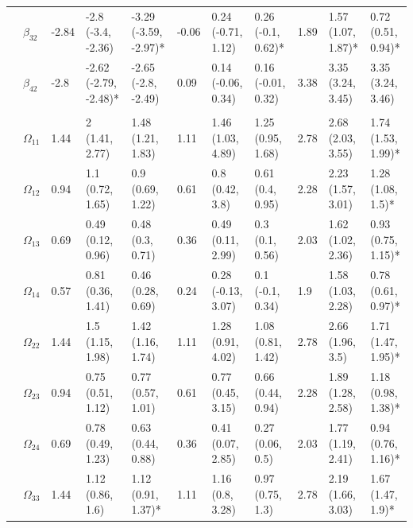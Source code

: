 \documentclass{article}
\begin{document}
\begin{landscape}
\begin{table}[t]
\begin{tabular}{lllllllllll}
\hspace{1em} & $\beta_{32}$ & -2.84 & -2.8 (-3.4, -2.36) & -3.29 (-3.59, -2.97)* & -0.06 & 0.24 (-0.71, 1.12) & 0.26 (-0.1, 0.62)* & 1.89 & 1.57 (1.07, 1.87)* & 0.72 (0.51, 0.94)*\\
\hspace{1em} & $\beta_{42}$ & -2.8 & -2.62 (-2.79, -2.48)* & -2.65 (-2.8, -2.49) & 0.09 & 0.14 (-0.06, 0.34) & 0.16 (-0.01, 0.32) & 3.38 & 3.35 (3.24, 3.45) & 3.35 (3.24, 3.46)\\
\addlinespace[0.3em]
\multicolumn{11}{l}{\textbf{ }}\\
\hspace{1em} & $\Omega_{11}$ & 1.44 & 2 (1.41, 2.77) & 1.48 (1.21, 1.83) & 1.11 & 1.46 (1.03, 4.89) & 1.25 (0.95, 1.68) & 2.78 & 2.68 (2.03, 3.55) & 1.74 (1.53, 1.99)*\\
\hspace{1em} & $\Omega_{12}$ & 0.94 & 1.1 (0.72, 1.65) & 0.9 (0.69, 1.22) & 0.61 & 0.8 (0.42, 3.8) & 0.61 (0.4, 0.95) & 2.28 & 2.23 (1.57, 3.01) & 1.28 (1.08, 1.5)*\\
\hspace{1em} & $\Omega_{13}$ & 0.69 & 0.49 (0.12, 0.96) & 0.48 (0.3, 0.71) & 0.36 & 0.49 (0.11, 2.99) & 0.3 (0.1, 0.56) & 2.03 & 1.62 (1.02, 2.36) & 0.93 (0.75, 1.15)*\\
\hspace{1em} & $\Omega_{14}$ & 0.57 & 0.81 (0.36, 1.41) & 0.46 (0.28, 0.69) & 0.24 & 0.28 (-0.13, 3.07) & 0.1 (-0.1, 0.34) & 1.9 & 1.58 (1.03, 2.28) & 0.78 (0.61, 0.97)*\\
\hspace{1em} & $\Omega_{22}$ & 1.44 & 1.5 (1.15, 1.98) & 1.42 (1.16, 1.74) & 1.11 & 1.28 (0.91, 4.02) & 1.08 (0.81, 1.42) & 2.78 & 2.66 (1.96, 3.5) & 1.71 (1.47, 1.95)*\\
\hspace{1em} & $\Omega_{23}$ & 0.94 & 0.75 (0.51, 1.12) & 0.77 (0.57, 1.01) & 0.61 & 0.77 (0.45, 3.15) & 0.66 (0.44, 0.94) & 2.28 & 1.89 (1.28, 2.58) & 1.18 (0.98, 1.38)*\\
\hspace{1em} & $\Omega_{24}$ & 0.69 & 0.78 (0.49, 1.23) & 0.63 (0.44, 0.88) & 0.36 & 0.41 (0.07, 2.85) & 0.27 (0.06, 0.5) & 2.03 & 1.77 (1.19, 2.41) & 0.94 (0.76, 1.16)*\\
\hspace{1em} & $\Omega_{33}$ & 1.44 & 1.12 (0.86, 1.6) & 1.12 (0.91, 1.37)* & 1.11 & 1.16 (0.8, 3.28) & 0.97 (0.75, 1.3) & 2.78 & 2.19 (1.66, 3.03) & 1.67 (1.47, 1.9)*\\

\end{tabular}
\end{table}
\end{landscape}
\end{document}
